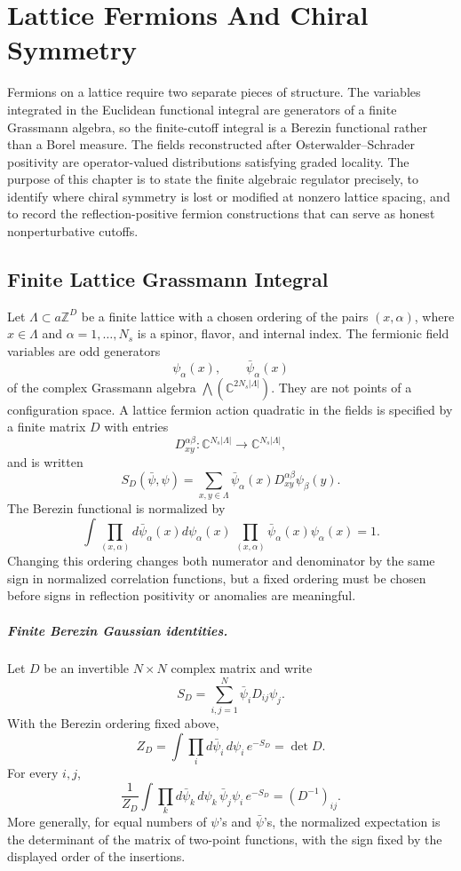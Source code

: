 \chapter{Lattice Fermions And Chiral Symmetry}
\label{ch:constructive-lattice-fermions-chiral-symmetry}

\ConventionsEuclidean

Fermions on a lattice require two separate pieces of structure.  The
variables integrated in the Euclidean functional integral are generators of a
finite Grassmann algebra, so the finite-cutoff integral is a Berezin
functional rather than a Borel measure.  The fields reconstructed after
Osterwalder--Schrader positivity are operator-valued distributions satisfying
graded locality.  The purpose of this chapter is to state the finite
algebraic regulator precisely, to identify where chiral symmetry is lost or
modified at nonzero lattice spacing, and to record the reflection-positive
fermion constructions that can serve as honest nonperturbative cutoffs.

\section{Finite Lattice Grassmann Integral}

Let \(\Lambda\subset a\mathbb Z^D\) be a finite lattice with a chosen ordering
of the pairs \((x,\alpha)\), where \(x\in\Lambda\) and
\(\alpha=1,\ldots,N_s\) is a spinor, flavor, and internal index.  The
fermionic field variables are odd generators
\[
  \psi_\alpha(x),\qquad \bar\psi_\alpha(x)
\]
of the complex Grassmann algebra
\(\bigwedge(\mathbb C^{2N_s|\Lambda|})\).  They are not points of a
configuration space.  A lattice fermion action quadratic in the fields is
specified by a finite matrix \(D\) with entries
\[
  D^{\alpha\beta}_{xy}:\mathbb C^{N_s|\Lambda|}
  \longrightarrow
  \mathbb C^{N_s|\Lambda|},
\]
and is written
\[
  S_D(\bar\psi,\psi)
  =
  \sum_{x,y\in\Lambda}
  \bar\psi_\alpha(x)D^{\alpha\beta}_{xy}\psi_\beta(y).
\]
The Berezin functional is normalized by
\[
  \int
  \prod_{(x,\alpha)}d\bar\psi_\alpha(x)d\psi_\alpha(x)\,
  \prod_{(x,\alpha)}\bar\psi_\alpha(x)\psi_\alpha(x)
  =
  1 .
\]
Changing this ordering changes both numerator and denominator by the same
sign in normalized correlation functions, but a fixed ordering must be
chosen before signs in reflection positivity or anomalies are meaningful.

\paragraph{Finite Berezin Gaussian identities.}
Let \(D\) be an invertible \(N\times N\) complex matrix and write
\[
  S_D=\sum_{i,j=1}^N\bar\psi_iD_{ij}\psi_j .
\]
With the Berezin ordering fixed above,
\[
  Z_D=
  \int\prod_i d\bar\psi_i\,d\psi_i\,e^{-S_D}
  =
  \det D .
\]
For every \(i,j\),
\[
  \frac{1}{Z_D}
  \int\prod_k d\bar\psi_k\,d\psi_k\,
  \bar\psi_j\psi_i\,e^{-S_D}
  =
  (D^{-1})_{ij}.
\]
More generally, for equal numbers of \(\psi\)'s and \(\bar\psi\)'s,
the normalized expectation is the determinant of the matrix of two-point
functions, with the sign fixed by the displayed order of the insertions.

